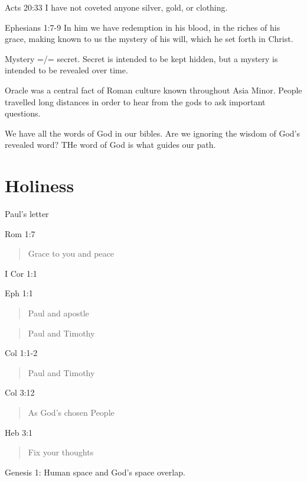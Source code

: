 \documentclass[
]{book}
\begin{document}
Acts 20:33 I have not coveted anyone silver, gold, or clothing.

Ephesians 1:7-9 In him we have redemption in his blood, in the riches of his grace, making known to us the mystery of his will, which he set forth in Christ.

Mystery =/= secret. Secret is intended to be kept hidden, but a mystery is intended to be revealed over time.

Oracle was a central fact of Roman culture known throughout Asia Minor. People travelled long distances in order to hear from the gods to ask important questions.

We have all the words of God in our bibles. Are we ignoring the wisdom of God's revealed word? THe word of God is what guides our path.

\hypertarget{holiness}{%
\section{Holiness}\label{holiness}}

Paul's letter

Rom 1:7

\begin{quote}
Grace to you and peace
\end{quote}

I Cor 1:1

\begin{quote}
\end{quote}

Eph 1:1

\begin{quote}
Paul and apostle
\end{quote}

\begin{quote}
Paul and Timothy
\end{quote}

Col 1:1-2

\begin{quote}
Paul and Timothy
\end{quote}

Col 3:12

\begin{quote}
As God's chosen People
\end{quote}

Heb 3:1

\begin{quote}
Fix your thoughts
\end{quote}

Genesis 1: Human space and God's space overlap.
\end{document}
